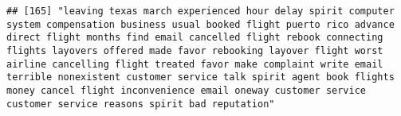 \documentclass[
]{article}
\begin{document}
\begin{verbatim}
## [165] "leaving texas march experienced hour delay spirit computer system compensation business usual booked flight puerto rico advance direct flight months find email cancelled flight rebook connecting flights layovers offered made favor rebooking layover flight worst airline cancelling flight treated favor make complaint write email terrible nonexistent customer service talk spirit agent book flights money cancel flight inconvenience email oneway customer service customer service reasons spirit bad reputation"                                                                                                                                                                                                                                                                                                                                                                                                                                                                                                                                                                                                                                                                                                                                                                                                                                                                                                                                                                                                                                                                                                                                                                                                                                                                  

\end{verbatim}
\end{document}
